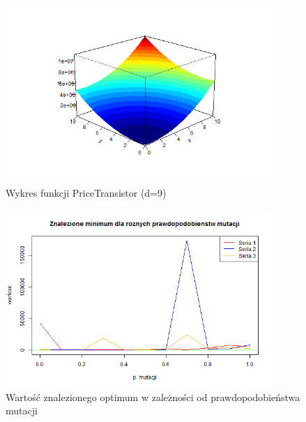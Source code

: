 \documentclass[11pt, a4paper]{article}
\begin{document}
\begin{figure}[H]
	\begin{center}
		\includegraphics[width=0.9\textwidth]{./assets/PriceTransistor1.png} %
		\caption{Wykres funkcji PriceTransistor (d=9)}
		\label{fig:pricetransistor1}
	\end{center}
\end{figure}

\begin{figure}[H]
	\begin{center}
		\includegraphics[width=0.9\textwidth]{./assets/PriceTransistor2.png} %
		\caption{Wartość znalezionego optimum w zależności od prawdopodobieństwa mutacji}
		\label{fig:pricetransistor2}
	\end{center}
\end{figure}
\end{document}
